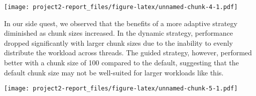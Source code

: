 \documentclass[
]{article}
\begin{document}
\texttt{[image: project2-report\_files/figure-latex/unnamed-chunk-4-1.pdf]}

In our side quest, we observed that the benefits of a more adaptive
strategy diminished as chunk sizes increased. In the dynamic strategy,
performance dropped significantly with larger chunk sizes due to the
inability to evenly distribute the workload across threads. The guided
strategy, however, performed better with a chunk size of 100 compared to
the default, suggesting that the default chunk size may not be
well-suited for larger workloads like this.

\texttt{[image: project2-report\_files/figure-latex/unnamed-chunk-5-1.pdf]}
\end{document}
